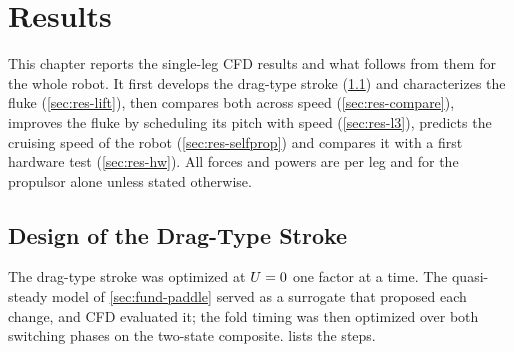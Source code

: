 \chapter{Results}
\label{ch:results}

This chapter reports the single-leg CFD results and what follows from them for the whole robot. It first
develops the drag-type stroke (\cref{sec:res-drag}) and characterizes the fluke (\cref{sec:res-lift}), then
compares both across speed (\cref{sec:res-compare}), improves the fluke by scheduling its pitch with speed
(\cref{sec:res-l3}), predicts the cruising speed of the robot (\cref{sec:res-selfprop}) and compares it with a first hardware
test (\cref{sec:res-hw}). All forces and powers are
per leg and for the propulsor alone unless stated otherwise.

\section{Design of the Drag-Type Stroke}
\label{sec:res-drag}

The drag-type stroke was optimized at $U=0$ one factor at a time. The quasi-steady model of \cref{sec:fund-paddle} served as a
surrogate that proposed each change, and CFD evaluated it; the fold timing was then optimized over both switching phases on the
two-state composite.  lists the steps.


